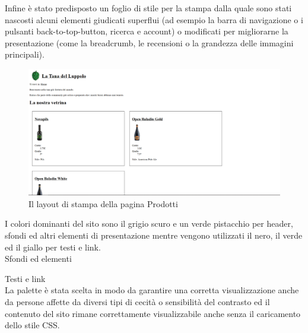 \pagebreak

Infine è stato predisposto un foglio di stile per la stampa dalla quale sono stati nascosti alcuni elementi giudicati superflui (ad esempio la barra di navigazione o i pulsanti back-to-top-button, ricerca e account) o modificati per migliorarne la presentazione (come la breadcrumb, le recensioni o la grandezza delle immagini principali).

\begin{figure}[H]
	\centering
	\caption{Il layout di stampa della pagina Prodotti}
	\includegraphics[width=16cm]{utility/prodotti_printcss.png}
\end{figure}

I colori dominanti del sito sono il grigio scuro e un verde pistacchio per header, sfondi ed altri elementi di presentazione mentre vengono utilizzati il nero, il verde ed il giallo per testi e link.\\

Sfondi ed elementi
\crule[hdgray]{1cm}{1cm} \crule[pistacho]{1cm}{1cm} \crule[puffo]{1cm}{1cm} 


Testi e link
\crule{1cm}{1cm} \crule[yellow]{1cm}{1cm} \crule[bcgreen]{1cm}{1cm} \crule[hdgreen]{1cm}{1cm}
\\

La palette è stata scelta in modo da garantire una corretta visualizzazione anche da persone affette da diversi tipi di cecità o sensibilità del contrasto ed il contenuto del sito rimane correttamente visualizzabile anche senza il caricamento dello stile CSS.

